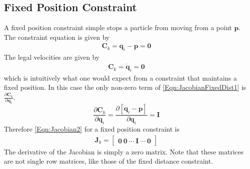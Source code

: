 \subsection{Fixed Position Constraint}
\label{SubSec:FixedPostionConstraint}
A fixed position constraint simple stops a particle from moving from a point
$\mathbf{p}$. The constraint
equation is given by
\begin{eqnarray}
	\label{Eqn:FixedPositionConstraint}
	\mathbf{C}_k = \mathbf{q}_i - \mathbf{p} = \mathbf{0} 
\end{eqnarray}
The legal velocities are given by
\begin{eqnarray}
	\label{Eqn:FixedPositionConVel}
	\mathbf{C}_k = \dot{\mathbf{q}}_i = \mathbf{0} 
\end{eqnarray}
which is intuitively what one would expect from a constraint that maintains a
fixed position.  In this case the only non-zero term of
\ref{Eqn:JacobianFixedDist1} is 
$\frac{\partial \mathbf{C}_k}{\partial \mathbf{q}_i}$.
\begin{equation}
	\label{Eqn:FixedPostionConstraint1}
	\frac{\partial \mathbf{C}_k}{\partial \mathbf{q}_i} = \frac{\partial
	\left[\mathbf{q}_i - \mathbf{p}\right]}{\partial \mathbf{q}_i} =
	\mathbf{I}
\end{equation}
Therefore \ref{Eqn:Jacobian2} for a fixed position constraint is
\begin{eqnarray}
	\label{Eqn:JacobianFixedPositionConstraint}
	\mathbf{J}_k = 
	\begin{bmatrix}
		\mathbf{0} \: \mathbf{0} \: \cdots \: \mathbf{I} \: \cdots \: \mathbf{0}
	\end{bmatrix}
\end{eqnarray}
The derivative of the Jacobian is simply a zero matrix. Note that these matrices
are not single row matrices, like those of the fixed distance constraint.

